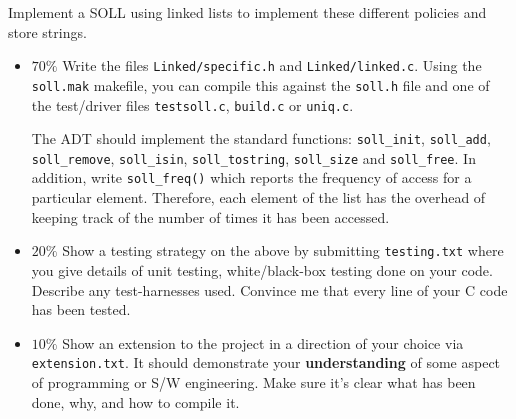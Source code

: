 \begin{exercise}

Implement a SOLL using linked lists to implement these different policies
and store strings.



\begin{itemize}
\item {\bf $70\%$}
Write the files \verb^Linked/specific.h^ and \verb^Linked/linked.c^. Using
the \verb^soll.mak^ makefile, you can compile this against the
\verb^soll.h^ file and one of the test/driver files \verb^testsoll.c^,
\verb^build.c^ or \verb^uniq.c^.

The ADT should implement the standard functions: \verb^soll_init^,
\verb^soll_add^, \verb^soll_remove^, \verb^soll_isin^,
\verb^soll_tostring^, \verb^soll_size^ and \verb^soll_free^.  In addition,
write \verb^soll_freq()^ which reports the frequency of access for a
particular element. Therefore, each element of the list has the
overhead of keeping track of the number of times it has been accessed.


\item {\bf $20\%$}
Show a testing strategy on the above by submitting \verb^testing.txt^
where you give details of
unit testing, white/black-box testing done on your code. Describe any
test-harnesses used. Convince me that every line of your C code
has been tested.

\item {\bf $10\%$}
Show an extension to the project in a direction of
your choice via \verb^extension.txt^.
It should demonstrate your {\bf understanding} of some aspect
of programming or S/W engineering. Make sure it's clear what has been
done, why, and how to compile it.
\end{itemize}


\end{exercise}
